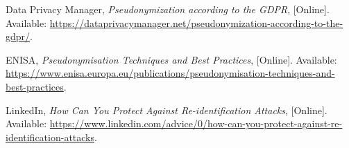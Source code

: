 
\begin{thebibliography}{9}

  Data Privacy Manager,
  \textit{Pseudonymization according to the GDPR},
  [Online]. Available: \url{https://dataprivacymanager.net/pseudonymization-according-to-the-gdpr/}. 

  ENISA,
  \textit{Pseudonymisation Techniques and Best Practices},
  [Online]. Available: \url{https://www.enisa.europa.eu/publications/pseudonymisation-techniques-and-best-practices}.

  LinkedIn,
  \textit{How Can You Protect Against Re-identification Attacks},
  [Online]. Available: \url{  https://www.linkedin.com/advice/0/how-can-you-protect-against-re-identification-attacks}.

\end{thebibliography}


